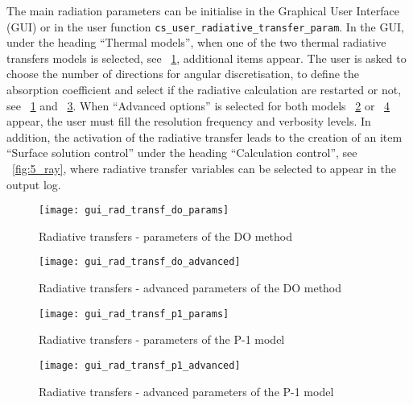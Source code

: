 The main radiation parameters can be initialise in the Graphical User Interface (GUI) or in the user function \texttt{cs\_user\_radiative\_transfer\_param}. In the GUI, under the heading ``Thermal models'', when one of the two thermal radiative transfers models is selected, see \figurename~\ref{fig:1_ray}, additional items appear. The user is asked to choose the number of directions for angular discretisation, to define the absorption coefficient and select if the radiative calculation are restarted or not,
see \figurename~\ref{fig:1_ray} and \figurename~\ref{fig:3_ray}. When ``Advanced options'' is selected for both models \figurename~\ref{fig:2_ray} or \figurename~\ref{fig:4_ray} appear, the user must fill the resolution frequency and verbosity levels. In addition, the activation of the radiative transfer leads to the creation of an item ``Surface solution control'' under the heading ``Calculation control'',
see \figurename~\ref{fig:5_ray}, where radiative transfer variables can be selected to appear in the output log.

\begin{figure}[ht]
\begin{center}
\texttt{[image: gui\_rad\_transf\_do\_params]}
\caption{Radiative transfers - parameters of the DO method}
\label{fig:1_ray}
\end{center}
\end{figure}

\begin{figure}[ht]
\begin{center}
\texttt{[image: gui\_rad\_transf\_do\_advanced]}
\caption{Radiative transfers - advanced parameters of the DO method}
\label{fig:2_ray}
\end{center}
\end{figure}

\begin{figure}[ht]
\begin{center}
\texttt{[image: gui\_rad\_transf\_p1\_params]}
\caption{Radiative transfers - parameters of the P-1 model}
\label{fig:3_ray}
\end{center}
\end{figure}

\begin{figure}[ht]
\begin{center}
\texttt{[image: gui\_rad\_transf\_p1\_advanced]}
\caption{Radiative transfers - advanced parameters of the P-1 model}
\label{fig:4_ray}
\end{center}
\end{figure}

